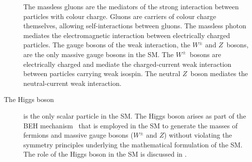 \begin{description}
  The massless gluons are the mediators of the strong interaction between
  particles with colour charge. Gluons are carriers of colour charge themselves,
  allowing self-interactions between gluons. The massless photon mediates the
  electromagnetic interaction between electrically charged particles. The gauge
  bosons of the weak interaction, the $W^\pm$ and $Z$~bosons, are the only
  massive gauge bosons in the SM. The $W^\pm$~bosons are electrically charged
  and mediate the charged-current weak interaction between particles carrying
  weak isospin. The neutral $Z$~boson mediates the neutral-current weak
  interaction.

\item[The Higgs boson] is the only scalar particle in the SM. The Higgs boson
  arises as part of the BEH %
  mechanism~\cite{Englert:1964et,Higgs:1964pj} that is employed in the SM to
  generate the masses of fermions and massive gauge bosons ($W^\pm$ and $Z$)
  without violating the symmetry principles underlying the mathematical
  formulation of the SM. The role of the Higgs boson in the SM is discussed in
  .

\end{description}


